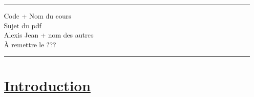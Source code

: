 \documentclass[11pt]{article}
\begin{document}
\renewcommand*{\contentsname}{Table des matières}

\hrule

\begin{center}
  {\Large Code + Nom du cours} \\ \vspace{5mm}
  {\LARGE\sffamily Sujet du pdf} \\
  Alexis Jean + nom des autres\\
  À remettre le ???
\end{center}

\hrule

\tableofcontents

\section{\underline{Introduction}}

\subsection{}
\end{document}
